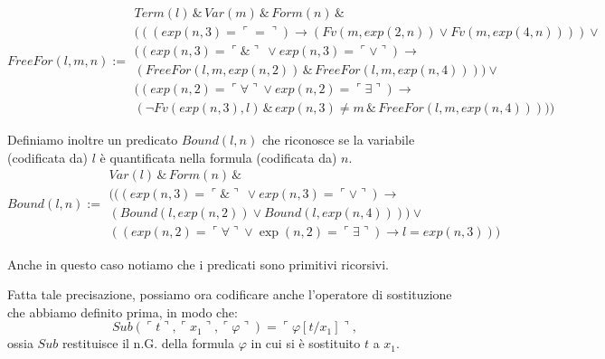 {\tiny
\begin{displaymath}
FreeFor(l,m,n):= \left.\begin{array}{l} Term(l) \,\&\, Var(m) \,\&\, Form(n) \,\&\, \\
(((exp(n,3) = \ulcorner = \urcorner)\rightarrow (Fv(m,exp(2,n))\vee Fv(m,exp(4,n))))\vee \\ 
((exp(n,3)= \ulcorner \& \urcorner \ \vee exp(n,3)= \ulcorner \vee \urcorner)\rightarrow \\
(FreeFor(l,m,exp(n,2)) \,\&\, FreeFor(l,m,exp(n,4)))) \vee \\
((exp(n,2) = \ulcorner \forall \urcorner \vee exp(n,2) = \ulcorner \exists \urcorner)\rightarrow \\
(\neg Fv(exp(n,3),l) \,\&\, exp(n,3)\ne m \,\&\, FreeFor(l,m,exp(n,4)))))
\end{array}\right.
\end{displaymath}}

Definiamo inoltre un predicato $Bound(l,n)$ che riconosce se la variabile (codificata da) $l$ \`e quantificata nella formula (codificata da) $n$.
{\tiny
\begin{displaymath}
 Bound(l,n):= \left.\begin{array}{l} Var(l) \,\&\, Form(n)\,\&\, \\
 (((exp(n,3) = \ulcorner \& \urcorner \ \vee exp(n,3)= \ulcorner \vee \urcorner) \rightarrow \\
(Bound(l,exp(n,2))\vee Bound(l,exp(n,4)))) \vee \\
((exp(n,2)= \ulcorner \forall \urcorner \vee \exp(n,2) = \ulcorner \exists \urcorner) \rightarrow l= exp(n,3)))
\end{array}\right.
\end{displaymath}}



Anche in questo caso notiamo che i predicati sono primitivi ricorsivi.

Fatta tale precisazione, possiamo ora codificare anche l'operatore di sostituzione che abbiamo definito prima, in modo che:
$$
Sub(\ulcorner t \urcorner, \ulcorner x_1 \urcorner, \ulcorner \varphi \urcorner) = \ulcorner \varphi[t/x_1] \urcorner,
$$
ossia $Sub$ restituisce il n.G. della formula $\varphi$ in cui si \`e sostituito $t$ a $x_1.$

